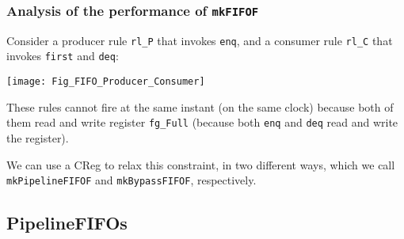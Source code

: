 
\begin{frame}[fragile]
\frametitle{Analysis of the performance of {\tt mkFIFOF}}

\footnotesize

Consider a producer rule \verb|rl_P| that invokes \verb|enq|, and a
consumer rule \verb|rl_C| that invokes \verb|first| and \verb|deq|:

\vspace{4ex}

\begin{center}
 \texttt{[image: Fig\_FIFO\_Producer\_Consumer]}
\end{center}

\vspace{4ex}

These rules cannot fire at the same instant (on the same clock)
because both of them read and write register \verb|fg_Full| (because
both \verb|enq| and \verb|deq| read and write the register).

\vspace{2ex}

We can use a CReg to relax this constraint, in two different ways,
which we call {\tt mkPipelineFIFOF} and {\tt mkBypassFIFOF},
respectively.

\end{frame}


\subsection{PipelineFIFOs}

